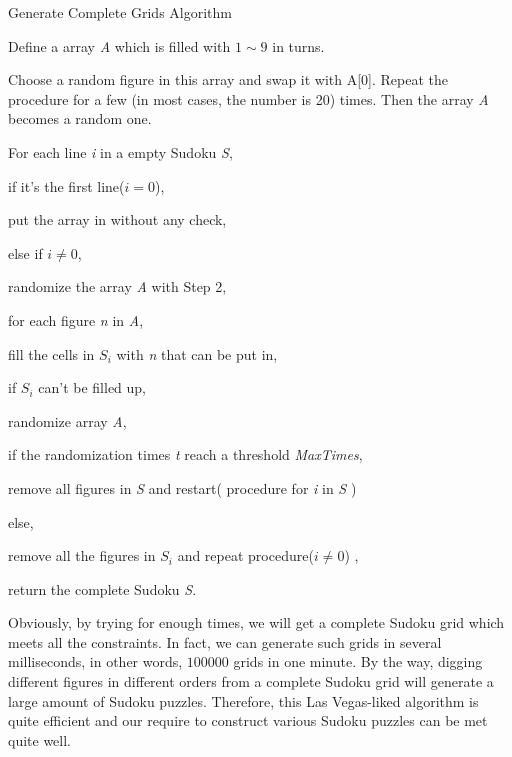 \documentclass{mcmthesis}
\begin{document}
\begin{framed}
\begin{list}{.}
    {\setlength{\parsep}{0ex}\setlength{\itemsep}{0ex}}
\item[] Generate Complete Grids Algorithm
\item Define a array \textit{A} which is filled with $1\sim9$ in turns. 
\item Choose a random figure in this array and swap it with A[0]. Repeat the procedure for a few (in most cases, the number is 20) times. Then the array \textit{A} becomes a random one.
\item For each line \textit{i} in a empty Sudoku \textit{S},
\item[] \qquad if it's the first line($\textit{i} = 0$),
\item[] \qquad \qquad put the array in without any check,
\item[] \qquad else if $\textit{i} \ne 0$,
\item[] \qquad \qquad randomize the array \textit{A} with Step 2,
\item[] \qquad \qquad for each figure \textit{n} in \textit{A},
\item[] \qquad \qquad \qquad fill the cells in $S_i$ with \textit{n} that can be put in, 
\item[] \qquad \qquad if $S_i$ can't be filled up,
\item[] \qquad \qquad \qquad randomize array \textit{A},
\item[] \qquad \qquad \qquad if the randomization times \textit{t} reach a threshold \textit{MaxTimes},
\item[] \qquad \qquad \qquad \qquad remove all figures in \textit{S} and restart( procedure for \textit{i} in \textit{S} )
\item[] \qquad \qquad \qquad else,
\item[] \qquad \qquad \qquad \qquad remove all the figures in $S_i$ and repeat procedure($\textit{i} \ne 0$) ,
\item return the complete Sudoku \textit{S}.
\end{list}
\end{framed}
\indent Obviously, by trying for enough times, we will get a complete Sudoku grid which meets all the constraints. In fact, we can generate such grids in several milliseconds, in other words, $100000$ grids in one minute. By the way, digging different figures in different orders from a complete Sudoku grid will generate a large amount of Sudoku puzzles. Therefore, this Las Vegas-liked algorithm is quite efficient and our require to construct various Sudoku puzzles can be met quite well.\\
\end{document}
